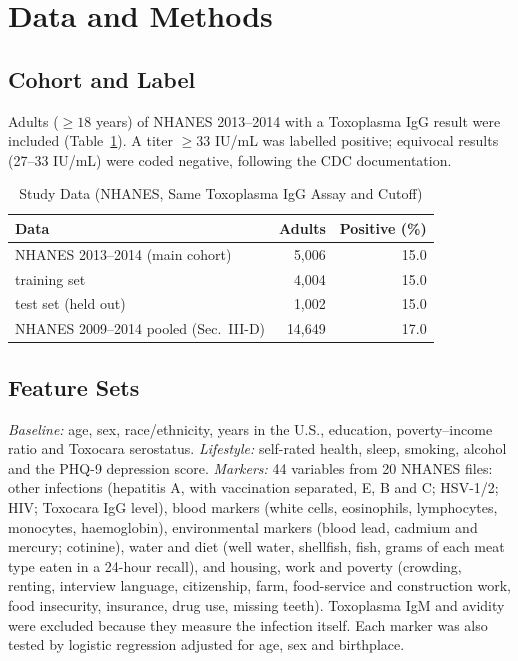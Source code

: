 \documentclass[conference]{IEEEtran}
\begin{document}
\section{Data and Methods}
\subsection{Cohort and Label}
Adults ($\ge 18$ years) of NHANES 2013--2014 with a Toxoplasma IgG result were included \cite{nhanes} (Table~\ref{tab:data}). A titer
$\ge 33$ IU/mL was labelled positive; equivocal results (27--33 IU/mL) were coded negative, following the CDC documentation.

\begin{table}[t]
\caption{Study Data (NHANES, Same Toxoplasma IgG Assay and Cutoff)}
\label{tab:data}
\centering
\begin{tabular}{@{}lrr@{}}
\toprule
Data & Adults & Positive (\%) \\
\midrule
NHANES 2013--2014 (main cohort) & 5,006 & 15.0 \\
\quad training set & 4,004 & 15.0 \\
\quad test set (held out) & 1,002 & 15.0 \\
NHANES 2009--2014 pooled (Sec.~III-D) & 14,649 & 17.0 \\
\bottomrule
\end{tabular}
\end{table}

\subsection{Feature Sets}
\emph{Baseline:} age, sex, race/ethnicity, years in the U.S., education, poverty--income ratio and Toxocara serostatus.
\emph{Lifestyle:} self-rated health, sleep, smoking, alcohol and the PHQ-9 depression score.
\emph{Markers:} 44 variables from 20 NHANES files: other infections (hepatitis A, with vaccination separated, E, B and C; HSV-1/2;
HIV; Toxocara IgG level), blood markers (white cells, eosinophils, lymphocytes, monocytes, haemoglobin), environmental markers (blood
lead, cadmium and mercury; cotinine), water and diet (well water, shellfish, fish, grams of each meat type eaten in a 24-hour recall),
and housing, work and poverty (crowding, renting, interview language, citizenship, farm, food-service and construction work, food
insecurity, insurance, drug use, missing teeth). Toxoplasma IgM and avidity were excluded because they measure the infection itself.
Each marker was also tested by logistic regression adjusted for age, sex and birthplace.
\end{document}
